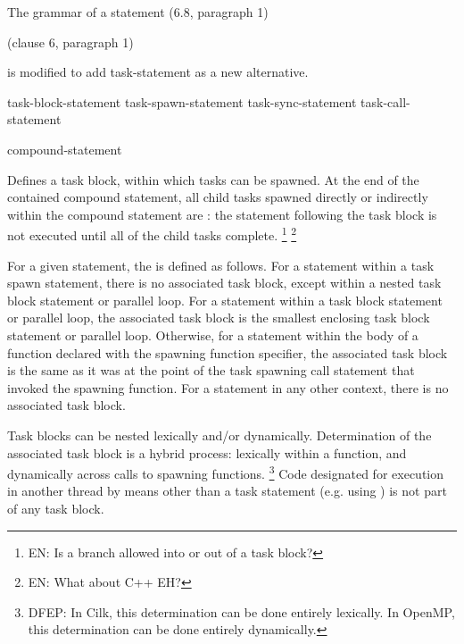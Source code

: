 
\pnum
The grammar of a statement (6.8, paragraph 1)
\begin{cpp}
(clause 6, paragraph 1)
\end{cpp}
is modified to add task-statement as a new alternative.


\begin{bnf}
\br
task-block-statement
\br
task-spawn-statement
\br
task-sync-statement
\br
task-call-statement
\end{bnf}


\begin{bnf}
\br
{}  compound-statement
\end{bnf}


\pnum
Defines a task block, within which tasks can be spawned.
At the end of the contained compound statement,
all child tasks spawned directly or indirectly
within the compound statement are
:
the statement following the task block is not executed
until all of the child tasks complete.
\footnote{EN:
Is a branch allowed into or out of a task block?
}
\footnote{EN:
What about C++ EH?
}

\pnum
For a given statement, the
is defined as follows.
For a statement within a task spawn statement,
there is no associated task block,
except within a nested task block statement
or parallel loop.
For a statement within a task block statement
or parallel loop,
the associated task block is the smallest enclosing task block statement
or parallel loop.
Otherwise, for a statement within the body of a function
declared with the spawning function specifier,
the associated task block is the same as it was
at the point of the task spawning call statement
that invoked the spawning function.
For a statement in any other context,
there is no associated task block.

\begin{note}
Task blocks can be nested lexically and/or dynamically.
Determination of the associated task block is a hybrid process:
lexically within a function,
and dynamically across calls to spawning functions.%
\footnote{DFEP:
In Cilk, this determination can be done entirely lexically.
In OpenMP, this determination can be done entirely dynamically.
}
Code designated for execution in another thread
by means other than a task statement
(e.g. using
)
is not part of any task block.
\end{note}

